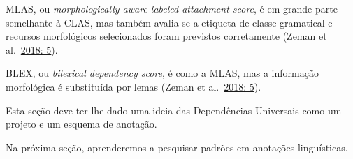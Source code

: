 \documentclass[
  brazilian,
]{article}
\begin{document}
MLAS, ou \emph{morphologically-aware labeled attachment score}, é em
grande parte semelhante à CLAS, mas também avalia se a etiqueta de
classe gramatical e recursos morfológicos selecionados foram previstos
corretamente (Zeman et
al.~\href{https://aclanthology.org/K18-2001.pdf}{2018: 5}).

BLEX, ou \emph{bilexical dependency score}, é como a MLAS, mas a
informação morfológica é substituída por lemas (Zeman et
al.~\href{https://aclanthology.org/K18-2001.pdf}{2018: 5}).

Esta seção deve ter lhe dado uma ideia das Dependências Universais como
um projeto e um esquema de anotação.

Na próxima seção, aprenderemos a pesquisar padrões em anotações
linguísticas.
\end{document}
